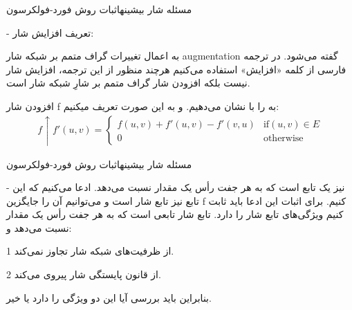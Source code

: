 \begin{itemframe}{مسئله شار بیشینه}{اثبات روش فورد-فولکرسون}
\item[-]
تعریف افزایش شار:
\item
به اعمال تغییرات گراف متمم بر شبکه شار augmentation گفته می‌شود. در ترجمه فارسی از کلمه «افزایش» استفاده می‌کنیم هرچند منظور از این ترجمه، افزایش شار نیست بلکه افزودن شار گراف متمم بر شارِ شبکه شار است.
\item
افزودن شار f به
را با
نشان می‌دهیم. و به این صورت تعریف میکنیم:
\begin{align}
f \uparrow f'(u, v)=
\begin{cases}
f(u, v)+f'(u, v)-f'(v, u)& \text{if} (u, v) \in E\\
0 &\text{otherwise}
\end{cases}
\label{aug-flow-def}
\end{align}
\end{itemframe}

\begin{itemframe}{مسئله شار بیشینه}{اثبات روش فورد-فولکرسون}
\item[-]
نیز یک تابع است که به هر جفت رأس یک مقدار نسبت می‌دهد. ادعا می‌کنیم که این تابع نیز تابع شار است و می‌توانیم آن را جایگزین f کنیم. برای اثبات این ادعا باید ثابت کنیم
ویژگی‌های تابع شار را دارد. تابع شار تابعی است که به هر جفت رأس یک مقدار نسبت می‌دهد و:
\item[1]
از ظرفیت‌های شبکه شار تجاوز نمی‌کند.
\item[2]
از قانون پایستگی شار پیروی می‌کند.
\item
بنابراین باید بررسی آیا
این دو ویژگی را دارد یا خیر.
\end{itemframe}

